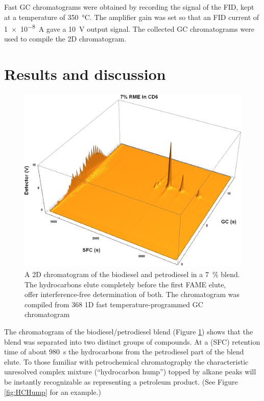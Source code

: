 Fast GC chromatograms were obtained by recording the signal of the FID, kept at
a temperature of \SI{350}{\celsius}. The amplifier gain was set so that an FID
current of \SI{1e-8}{\ampere} gave a \SI{10}{\volt} output signal. The collected
GC chromatograms were used to compile the 2D chromatogram.

\section{Results and discussion}


\begin{figure}
	\centering
	\includegraphics[width=\textwidth]{Figures/PAH_FAMEs.png}
	\decoRule	
	
\caption[Biodiesel separated from petrodiesel.]{A 2D chromatogram of the
biodiesel and petrodiesel in a \SI{7}{\percent} blend. The hydrocarbons elute
completely before the first FAME elute, offer interference-free determination of
both. The chromatogram was compiled from \num{368} 1D fast temperature-programmed GC
chromatogram}

	\label{fig:PAH_FAMEs} 
\end{figure}




The chromatogram of the biodiesel/petrodiesel blend (Figure \ref{fig:PAH_FAMEs})
shows that the blend was separated into two distinct groups of compounds. At a
\oneD (SFC) retention time of about \SI{980}{\second} the hydrocarbons from the
petrodiesel part of the blend elute. To those familiar with petrochemical
chromatography the characteristic unresolved complex mixture (``hydrocarbon
hump'') topped by alkane peaks will be instantly recognizable as representing a
petroleum product. (See Figure \ref{fig:HCHump} for an example.)

